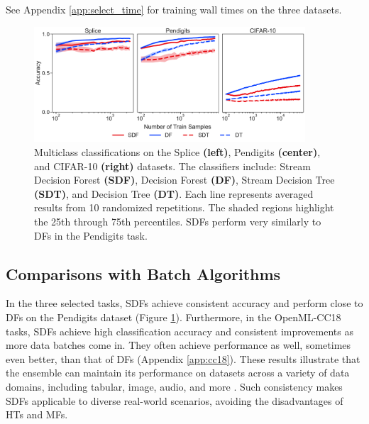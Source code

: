 See Appendix \ref{app:select_time} for training wall times on the three datasets.

\begin{figure}[!htb]
\centering
\includegraphics[width=0.9\textwidth]{select_acc_batch}
  \caption{Multiclass classifications on the Splice \textbf{(left)}, Pendigits \textbf{(center)}, and CIFAR-10 \textbf{(right)} datasets. The classifiers include: Stream Decision Forest \textbf{(SDF)}, Decision Forest \textbf{(DF)}, Stream Decision Tree \textbf{(SDT)}, and Decision Tree \textbf{(DT)}. 
  Each line represents averaged results from 10 randomized repetitions. The shaded regions highlight the 25th through 75th percentiles. SDFs perform very similarly to DFs in the Pendigits task.
  }
\label{fig:select_acc_batch}
\end{figure}

\subsection{Comparisons with Batch Algorithms}
In the three selected tasks, SDFs achieve consistent accuracy and perform close to DFs on the Pendigits dataset (Figure \ref{fig:select_acc_batch}). Furthermore, in the OpenML-CC18 tasks, SDFs achieve high classification accuracy and consistent improvements as more data batches come in. They often achieve performance as well, sometimes even better, than that of DFs (Appendix \ref{app:cc18}). These results illustrate that the ensemble can maintain its performance on datasets across a variety of data domains, including tabular, image, audio, and more \citep{bischl_openml_2019}. Such consistency makes SDFs applicable to diverse real-world scenarios, avoiding the disadvantages of HTs and MFs.


